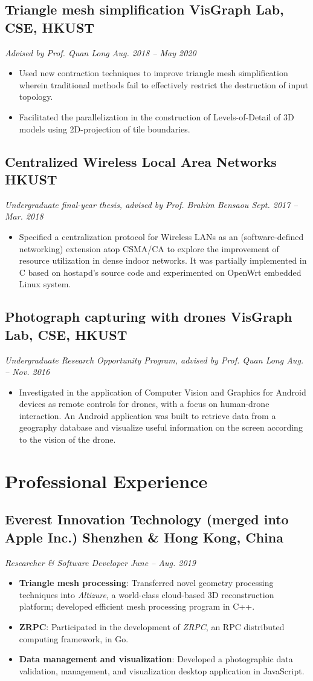 \documentclass[10pt]{article}
\newcommand{\subsec}[2]{\subsection*{#1 \hfill {\normalfont #2}}}
\newcommand{\subsecdesc}[2]{{\em #1 \hfill #2}}
\begin{document}
  \subsec{Triangle mesh simplification}{VisGraph Lab, CSE, HKUST}
  \subsecdesc{Advised by Prof. Quan Long}{Aug. 2018 -- May 2020}
  \begin{itemize}
    \item Used new contraction techniques to improve triangle mesh simplification wherein traditional methods fail to effectively restrict the destruction of input topology.
    \item Facilitated the parallelization in the construction of Levels-of-Detail of 3D models using 2D-projection of tile boundaries.
  \end{itemize}

  \subsec{Centralized Wireless Local Area Networks}{HKUST}
  \subsecdesc{Undergraduate final-year thesis, advised by Prof. Brahim Bensaou}{Sept. 2017 -- Mar. 2018}
  \begin{itemize}
    \item Specified a centralization protocol for Wireless LANs as an (software-defined networking) extension atop CSMA/CA to explore the improvement of resource utilization in dense indoor networks. It was partially implemented in C based on hostapd's source code and experimented on OpenWrt embedded Linux system.
  \end{itemize}

  \subsec{Photograph capturing with drones}{VisGraph Lab, CSE, HKUST}
  \subsecdesc{Undergraduate Research Opportunity Program, advised by Prof. Quan Long}{Aug. -- Nov. 2016}
  \begin{itemize}
    \item Investigated in the application of Computer Vision and Graphics for Android devices as remote controls for drones, with a focus on human-drone interaction. An Android application was built to retrieve data from a geography database and visualize useful information on the screen according to the vision of the drone.
  \end{itemize}

\section*{Professional Experience} %

  \subsec{Everest Innovation Technology \small{(merged into Apple Inc.)}}{Shenzhen \& Hong Kong, China}
  \subsecdesc{Researcher \& Software Developer}{June -- Aug. 2019}
  \begin{itemize}
    \item \textbf{Triangle mesh processing}: Transferred novel geometry processing techniques into \emph{Altizure}, a world-class cloud-based 3D reconstruction platform; developed efficient mesh processing program in C++.
    \item \textbf{ZRPC}: Participated in the development of \emph{ZRPC}, an RPC distributed computing framework, in Go.
    \item \textbf{Data management and visualization}: Developed a photographic data validation, management, and visualization desktop application in JavaScript.
  \end{itemize}
          
\end{document}
